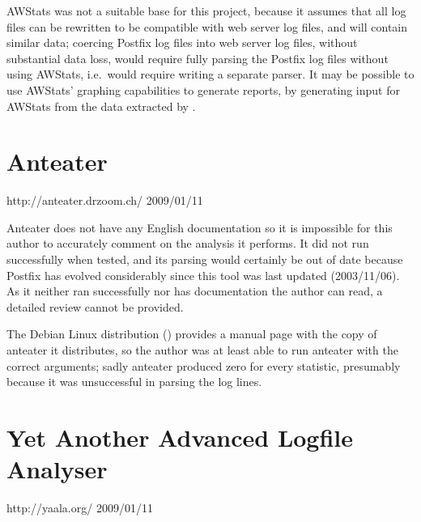 AWStats was not a suitable base for this project, because it assumes that
all log files can be rewritten to be compatible with web server log files,
and will contain similar data; coercing Postfix log files into web server
log files, without substantial data loss, would require fully parsing the
Postfix log files without using AWStats, i.e.\ would require writing a
separate parser.  It may be possible to use AWStats' graphing capabilities
to generate reports, by generating input for AWStats from the data
extracted by \parsername{}.

\section{Anteater}

{http://anteater.drzoom.ch/}
{2009/01/11}

Anteater does not have any English documentation so it is impossible for
this author to accurately comment on the analysis it performs.  It did not
run successfully when tested, and its parsing would certainly be out of
date because Postfix has evolved considerably since this tool was last
updated (2003/11/06).  As it neither ran successfully nor has documentation
the author can read, a detailed review cannot be provided.

The Debian Linux distribution
() provides a manual
page with the copy of anteater it distributes, so the author was at least
able to run anteater with the correct arguments; sadly anteater produced
zero for every statistic, presumably because it was unsuccessful in parsing
the log lines.

\section{Yet Another Advanced Logfile Analyser}

{http://yaala.org/}
{2009/01/11}

